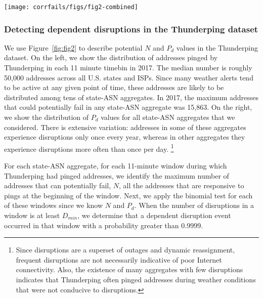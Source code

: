 \begin{figure*}[t]
\centering
\texttt{[image: corrfails/figs/fig2-combined]}
\caption[Potential $N$ and $P_d$ values in the Thunderping dataset]{
\label{fig:fig2}
Potential $N$ and $P_d$ values in the Thunderping dataset: On
the left, we show the distribution of all addresses (across all
state-ASN aggregates) pinged by Thunderping that can potentially fail in each 11 minute
time bin. On the right, we show the distribution of the probability of disruption ($P_d$) for various state-ASN address aggregates.}
\end{figure*}

\subsubsection*{Detecting dependent disruptions in the Thunderping dataset}

\label{sec:tping-detection}

We use Figure~\ref{fig:fig2} to describe potential $N$ and $P_d$
values in the Thunderping dataset. On the left, we show the distribution
of addresses pinged by Thunderping in each 11 minute timebin in 2017. The
median number is roughly 50,000 addresses across all U.S. states and
ISPs. Since many weather alerts tend to be active at any given point of time,
these addresses are likely to be distributed among tens of state-ASN
aggregates. In 2017, the maximum addresses that could potentially fail in
any state-ASN aggregate was 15,863. On the right, we show the
distribution of $P_d$ values for all state-ASN aggregates that we
considered. There is extensive 
variation: addresses in some of these aggregates experience
disruptions only once every
year, whereas in other aggregates they experience disruptions more often than once per
day. \footnote{Since disruptions are a superset of outages and dynamic
  reassignment, frequent disruptions are not necessarily indicative of
  poor Internet connectivity. Also, the existence of many aggregates with few
  disruptions indicates that Thunderping often pinged addresses during weather
  conditions that were not conducive to disruptions.} 

For each state-ASN aggregate, for each 11-minute window
during which Thunderping had pinged addresses, we identify the maximum
number of addresses that can potentially fail, $N$, \ie all the
addresses that are responsive to pings at the beginning of the
window. Next, we apply the binomial test for each of these windows
since we know $N$ and $P_d$. When the number of disruptions in a window
is at least $D_{min}$, we determine that a dependent disruption event
occurred in that window with a probability greater than 0.9999. 

